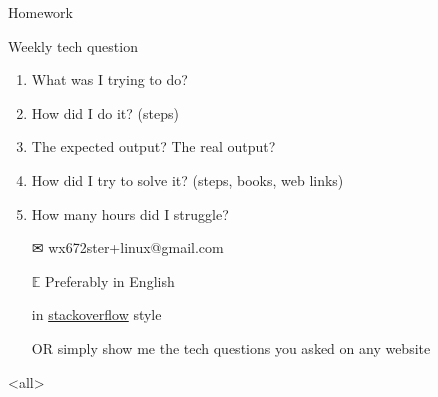 \begin{frame}{{\hw\enspace}Homework}
  \begin{block}{Weekly tech question}
    \begin{enumerate}
    \item What was I trying to do?
    \item How did I do it? (steps)
    \item The expected output? The real output?
    \item How did I try to solve it? (steps, books, web links)
    \item How many hours did I struggle?
    \end{enumerate}
  \end{block}
  \begin{itemize}
  \item[\Large\dejavu ✉] \alert{\ttfamily wx672ster+linux@gmail.com}
  \item[$\mathbb{E}$] Preferably in English
  \item[\stackoverflow] in
    \href{https://stackoverflow.com/questions/39199299/what-is-the-essential-difference-between-compound-command-and-normal-command-inlink}{stackoverflow}
    style
  \item[OR] simply show me the tech questions you asked on any website
  \end{itemize}  
\end{frame}

\begin{frame}
  \begin{center}
  \end{center}
\end{frame}


\mode<all>
